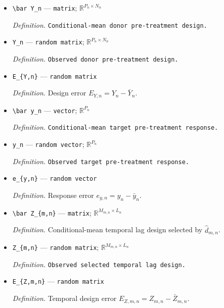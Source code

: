 \documentclass{article}
\begin{document}
\begin{itemize}
  \item \texttt{\textbackslash{}\allowbreak{}bar Y\_\allowbreak{}n} --- \texttt{matrix}; \(\mathbb R^{P_n\times N_n}\)
  \par\smallskip\noindent\emph{Definition.} \texttt{Conditional-\allowbreak{}mean donor pre-\allowbreak{}treatment design.}
  \item \texttt{Y\_\allowbreak{}n} --- \texttt{random matrix}; \(\mathbb R^{P_n\times N_n}\)
  \par\smallskip\noindent\emph{Definition.} \texttt{Observed donor pre-\allowbreak{}treatment design.}
  \item \texttt{E\_\allowbreak{}\{Y,\allowbreak{}n\}\allowbreak{}} --- \texttt{random matrix}
  \par\smallskip\noindent\emph{Definition.} Design error \(E_{Y,n}=Y_n-\bar Y_n\).
  \item \texttt{\textbackslash{}\allowbreak{}bar y\_\allowbreak{}n} --- \texttt{vector}; \(\mathbb R^{P_n}\)
  \par\smallskip\noindent\emph{Definition.} \texttt{Conditional-\allowbreak{}mean target pre-\allowbreak{}treatment response.}
  \item \texttt{y\_\allowbreak{}n} --- \texttt{random vector}; \(\mathbb R^{P_n}\)
  \par\smallskip\noindent\emph{Definition.} \texttt{Observed target pre-\allowbreak{}treatment response.}
  \item \texttt{e\_\allowbreak{}\{y,\allowbreak{}n\}\allowbreak{}} --- \texttt{random vector}
  \par\smallskip\noindent\emph{Definition.} Response error \(e_{y,n}=y_n-\bar y_n\).
  \item \texttt{\textbackslash{}\allowbreak{}bar Z\_\allowbreak{}\{m,\allowbreak{}n\}\allowbreak{}} --- \texttt{matrix}; \(\mathbb R^{M_{m,n}\times L_n}\)
  \par\smallskip\noindent\emph{Definition.} Conditional-mean temporal lag design selected by \(\widehat d_{m,n}\).
  \item \texttt{Z\_\allowbreak{}\{m,\allowbreak{}n\}\allowbreak{}} --- \texttt{random matrix}; \(\mathbb R^{M_{m,n}\times L_n}\)
  \par\smallskip\noindent\emph{Definition.} \texttt{Observed selected temporal lag design.}
  \item \texttt{E\_\allowbreak{}\{Z,\allowbreak{}m,\allowbreak{}n\}\allowbreak{}} --- \texttt{random matrix}
  \par\smallskip\noindent\emph{Definition.} Temporal design error \(E_{Z,m,n}=Z_{m,n}-\bar Z_{m,n}\).

\end{itemize}
\end{document}
